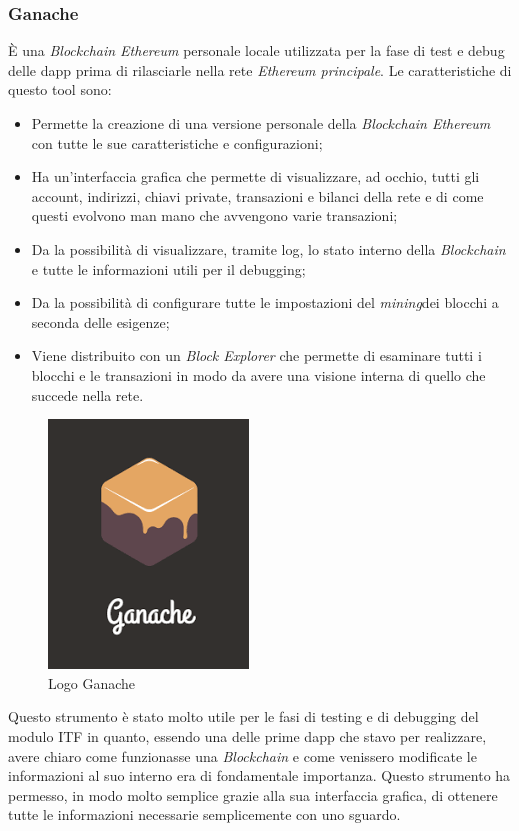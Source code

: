 \subsubsection{Ganache}

È una \textit{Blockchain Ethereum} personale locale utilizzata per la fase di test e debug delle \gls{dapp} prima di rilasciarle nella rete \textit{Ethereum principale}.
Le caratteristiche di questo tool sono\cite{ganache}:
\begin{itemize}
	\item Permette la creazione di una versione personale della \textit{Blockchain Ethereum} con tutte le sue caratteristiche e configurazioni;
	\item Ha un'interfaccia grafica che permette di visualizzare, ad occhio, tutti gli account, indirizzi, chiavi private, transazioni e bilanci della rete e di come questi evolvono man mano che avvengono varie transazioni;
	\item Da la possibilità di visualizzare, tramite log, lo stato interno della \textit{Blockchain} e tutte le informazioni utili per il debugging;
	\item Da la possibilità di configurare tutte le impostazioni del \emph{\gls{mining}}\glsfirstoccur dei blocchi a seconda delle esigenze;
	\item Viene distribuito con un \textit{Block Explorer} che permette di esaminare tutti i blocchi e le transazioni in modo da avere una visione interna di quello che succede nella rete.
\end{itemize}
\begin{figure}[h]
	\centering
	\includegraphics[scale=0.5]{immagini/ganache}
	\caption{Logo Ganache}
\end{figure}
Questo strumento è stato molto utile per le fasi di testing e di debugging del modulo \gls{ITF} in quanto, essendo una delle prime \gls{dapp} che stavo per realizzare, avere chiaro come funzionasse una \textit{Blockchain} e come venissero modificate le informazioni al suo interno era di fondamentale importanza. Questo strumento ha permesso, in modo molto semplice grazie alla sua interfaccia grafica, di ottenere tutte le informazioni necessarie semplicemente con uno sguardo.
